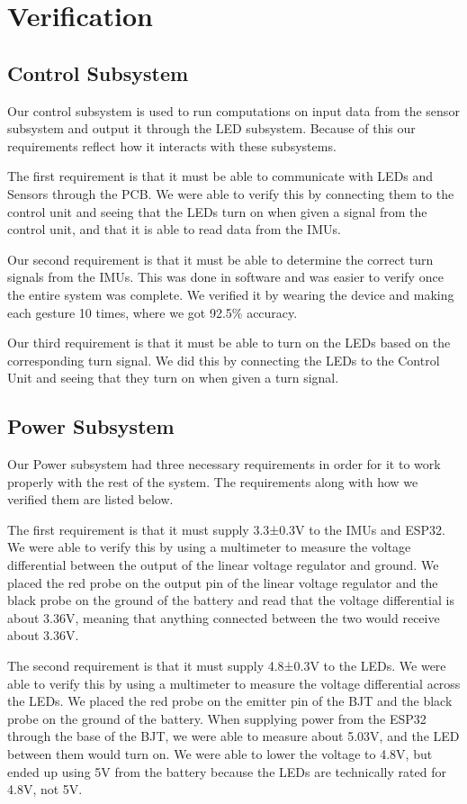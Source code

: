 \section{Verification}

\subsection{Control Subsystem}
Our control subsystem is used to run computations on input data from the sensor subsystem and output it through the LED subsystem. Because of this our requirements reflect how it interacts with these subsystems.

The first requirement is that it must be able to communicate with LEDs and Sensors through the PCB. We were able to verify this by connecting them to the control unit and seeing that the LEDs turn on when given a signal from the control unit, and that it is able to read data from the IMUs. 

Our second requirement is that it must be able to determine the correct turn signals from the IMUs. This was done in software and was easier to verify once the entire system was complete. We verified it by wearing the device and making each gesture 10 times, where we got 92.5\% accuracy. 

Our third requirement is that it must be able to turn on the LEDs based on the corresponding turn signal. We did this by connecting the LEDs to the Control Unit and seeing that they turn on when given a turn signal.
\subsection{Power Subsystem}
Our Power subsystem had three necessary requirements in order for it to work properly with the rest of the system. The requirements along with how we verified them are listed below.

The first requirement is that it must supply 3.3±0.3V to the IMUs and ESP32. We were able to verify this by using a multimeter to measure the voltage differential between the output of the linear voltage regulator and ground. We placed the red probe on the output pin of the linear voltage regulator and the black probe on the ground of the battery and read that the voltage differential is about 3.36V, meaning that anything connected between the two would receive about 3.36V.

The second requirement is that it must supply 4.8±0.3V to the LEDs. We were able to verify this by using a multimeter to measure the voltage differential across the LEDs. We placed the red probe on the emitter pin of the BJT and the black probe on the ground of the battery. When supplying power from the ESP32 through the base of the BJT, we were able to measure about 5.03V, and the LED between them would turn on. We were able to lower the voltage to 4.8V, but ended up using 5V from the battery because the LEDs are technically rated for 4.8V, not 5V.

